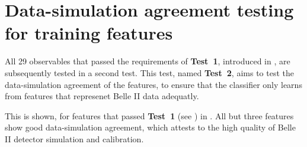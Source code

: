\chapter{Data-simulation agreement testing for \texorpdfstring{\BDT}{BDT} training features}\label{sec:appendix_continuum_features_datamc}

All 29 observables that passed the requirements of \textbf{Test~1}, introduced in , are subsequently tested in a second test.
This test, named \textbf{Test~2}, aims to test the data-simulation agreement of the features, to ensure that the classifier only learns from features that represenet Belle II data adequatly.

This is shown, for features that passed \textbf{Test~1} (see ) in .
All but three features show good data-simulation agreement, which attests to the high quality of Belle II detector simulation and calibration.

